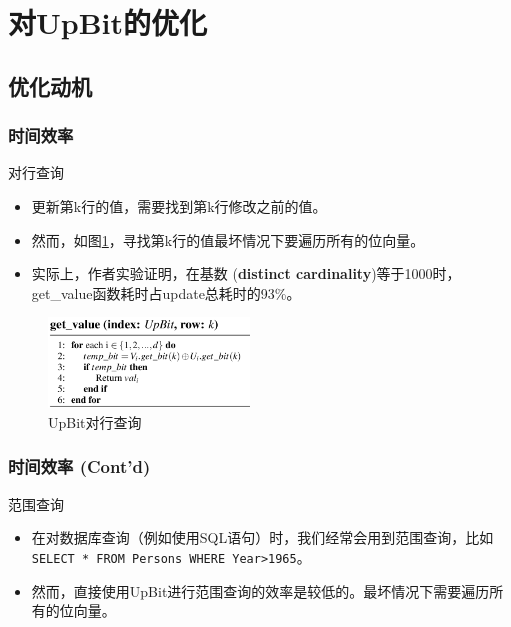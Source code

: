 \documentclass[hyperref={unicode=true}]{beamer}
\begin{document}
\section{对UpBit的优化}
\subsection{优化动机}
\begin{frame}\frametitle{时间效率}
  \begin{exampleblock}{对行查询}
    \begin{minipage}[c]{0.45\textwidth}
      \begin{itemize}[<+->]
      \item 更新第k行的值，需要找到第k行修改之前的值。
      \item 然而，如图\ref{fig:get_value}，寻找第k行的值最坏情况下要遍历所有的位向量。
      \item 实际上，作者实验证明，在基数 ({\bf distinct cardinality})等于1000时，get\_value函数耗时占update总耗时的93\%。
      \end{itemize}
    \end{minipage}
    \begin{minipage}[c]{0.45\textwidth}
      \begin{figure}[H]
        \begin{center}
          \includegraphics[width=2.1in]{get_value.png}
          \caption{UpBit对行查询}\label{fig:get_value}
        \end{center}
      \end{figure}
    \end{minipage}
  \end{exampleblock}
\end{frame}
\begin{frame}\frametitle{时间效率 (Cont'd)}
  \begin{exampleblock}{范围查询}
    \begin{itemize}[<+->]
    \item 在对数据库查询（例如使用SQL语句）时，我们经常会用到范围查询，比如\texttt{SELECT * FROM Persons WHERE Year>1965}。
    \item 然而，直接使用UpBit进行范围查询的效率是较低的。最坏情况下需要遍历所有的位向量。
    \end{itemize}
  \end{exampleblock}
\end{frame}
\end{document}
